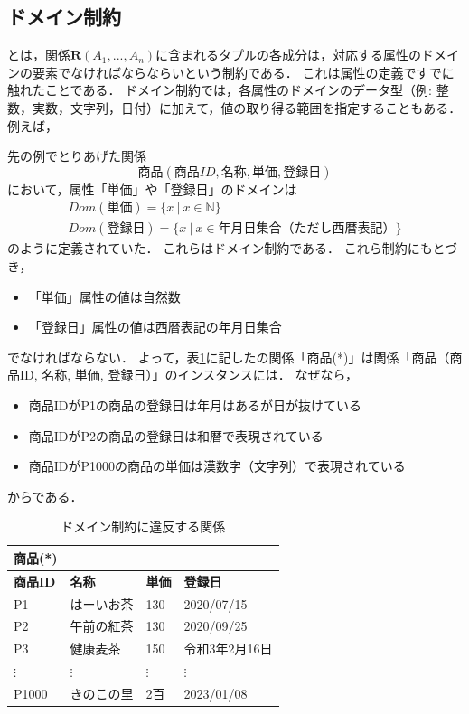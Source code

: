 \subsection{ドメイン制約}
 とは，関係$\boldsymbol{R}(A_1, ..., A_n)$に含まれるタプルの各成分は，対応する属性のドメインの要素でなければならならいという制約である．
これは属性の定義ですでに触れたことである．
ドメイン制約では，各属性のドメインのデータ型（例: 整数，実数，文字列，日付）に加えて，値の取り得る範囲を指定することもある．
例えば，

先の例でとりあげた関係
\begin{equation}
商品(商品ID, 名称, 単価, 登録日)
\end{equation}
において，属性「単価」や「登録日」のドメインは
\begin{eqnarray}
Dom(単価) = \{ x \ | \ x \in \mathbb{N} \} \\
Dom(登録日) = \{ x \ | \ x \in 年月日集合（ただし西暦表記） \}
\end{eqnarray}
のように定義されていた．
これらはドメイン制約である．
これら制約にもとづき，
\begin{itemize}
\item 「単価」属性の値は自然数
\item 「登録日」属性の値は西暦表記の年月日集合
\end{itemize}
でなければならない．
よって，表\ref{tab:incorrect-table}に記したの関係「商品(*)」は関係「商品（商品ID, 名称, 単価, 登録日）」のインスタンスには．
なぜなら，
\begin{itemize}
\item 商品IDがP1の商品の登録日は年月はあるが日が抜けている
\item 商品IDがP2の商品の登録日は和暦で表現されている
\item 商品IDがP1000の商品の単価は漢数字（文字列）で表現されている
\end{itemize}
からである．

\begin{table}[tb]
\centering
\caption{ドメイン制約に違反する関係}
\label{tab:incorrect-table}
\begin{tabular}{@{}llll@{}}
商品(*)            &             &             &              \\ \midrule
\textbf{商品ID} & \textbf{名称} & \textbf{単価} & \textbf{登録日} \\ \midrule
P1            & はーいお茶       & 130         & 2020/07/15   \\
P2            & 午前の紅茶       & 130         & 2020/09/25   \\
P3            & 健康麦茶        & 150         & 令和3年2月16日   \\
$\vdots$      & $\vdots$    & $\vdots$    & $\vdots$     \\
P1000         & きのこの里       & 2百         & 2023/01/08   \\ \bottomrule
\end{tabular}
\end{table}


